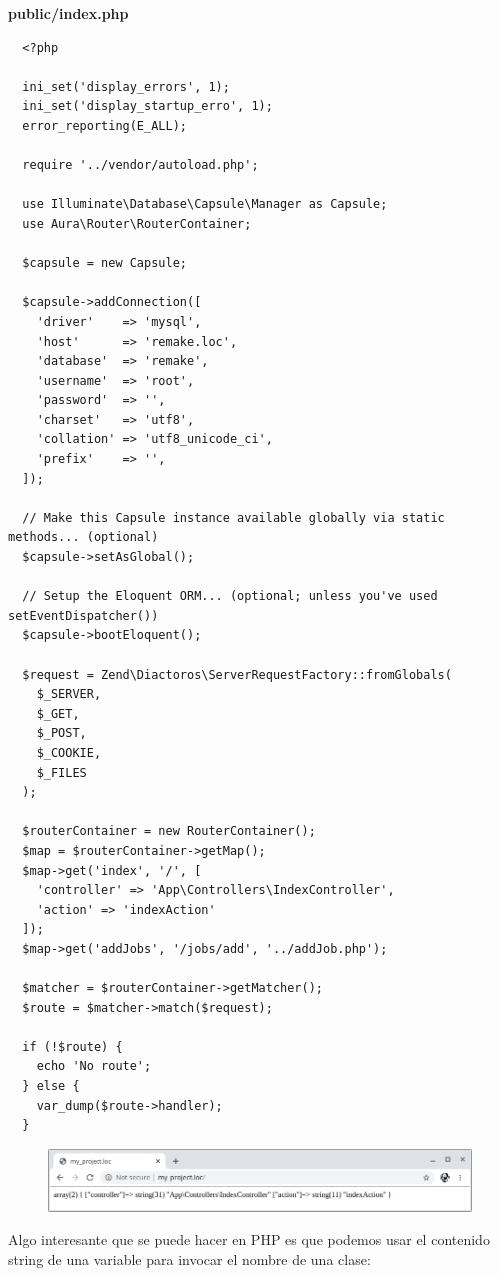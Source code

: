 \documentclass{article}
\begin{document}
\textbf{public/index.php}
\begin{verbatim}
  <?php

  ini_set('display_errors', 1);
  ini_set('display_startup_erro', 1);
  error_reporting(E_ALL);

  require '../vendor/autoload.php';

  use Illuminate\Database\Capsule\Manager as Capsule;
  use Aura\Router\RouterContainer;

  $capsule = new Capsule;

  $capsule->addConnection([
    'driver'    => 'mysql',
    'host'      => 'remake.loc',
    'database'  => 'remake',
    'username'  => 'root',
    'password'  => '',
    'charset'   => 'utf8',
    'collation' => 'utf8_unicode_ci',
    'prefix'    => '',
  ]);

  // Make this Capsule instance available globally via static methods... (optional)
  $capsule->setAsGlobal();

  // Setup the Eloquent ORM... (optional; unless you've used setEventDispatcher())
  $capsule->bootEloquent();

  $request = Zend\Diactoros\ServerRequestFactory::fromGlobals(
    $_SERVER,
    $_GET,
    $_POST,
    $_COOKIE,
    $_FILES
  );

  $routerContainer = new RouterContainer();
  $map = $routerContainer->getMap();
  $map->get('index', '/', [
    'controller' => 'App\Controllers\IndexController',
    'action' => 'indexAction'
  ]);
  $map->get('addJobs', '/jobs/add', '../addJob.php');

  $matcher = $routerContainer->getMatcher();
  $route = $matcher->match($request);

  if (!$route) {
    echo 'No route';
  } else {
    var_dump($route->handler);
  }
\end{verbatim}

\begin{figure}[h!]
  \centering
  \includegraphics[scale=0.5]{./Pictures/126_controller_array_handler.png}
\end{figure}

Algo interesante que se puede hacer en PHP es que podemos usar el contenido
string de una variable para invocar el nombre de una clase:\\
\end{document}
